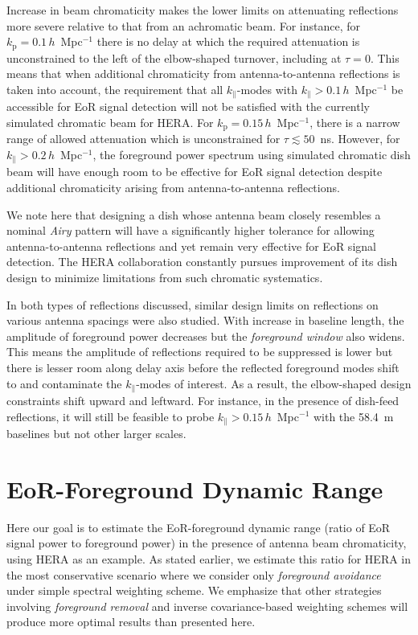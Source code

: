 \documentclass[preprint2,iop,numberedappendix,twocolappendix,appendixfloats]{emulateapj}
\begin{document}
Increase in beam chromaticity makes the lower limits on attenuating reflections more severe relative to that from an achromatic beam. For instance, for $k_\textrm{p}=0.1\,h$~Mpc$^{-1}$ there is no delay at which the required attenuation is unconstrained to the left of the elbow-shaped turnover, including at $\tau=0$. This means that when additional chromaticity from antenna-to-antenna reflections is taken into account, the requirement that all $k_\parallel$-modes with $k_\parallel > 0.1\,h$~Mpc$^{-1}$ be accessible for EoR signal detection will not be satisfied with the currently simulated chromatic beam for HERA. For $k_\textrm{p}=0.15\,h$~Mpc$^{-1}$, there is a narrow range of allowed attenuation which is unconstrained for $\tau \lesssim 50$~ns. However, for $k_\parallel > 0.2\,h$~Mpc$^{-1}$, the foreground power spectrum using simulated chromatic dish beam will have enough room to be effective for EoR signal detection despite additional chromaticity arising from antenna-to-antenna reflections. 

We note here that designing a dish whose antenna beam closely resembles a nominal {\it Airy} pattern will have a significantly higher tolerance for allowing antenna-to-antenna reflections and yet remain very effective for EoR signal detection. The HERA collaboration constantly pursues improvement of its dish design to minimize limitations from such chromatic systematics.

In both types of reflections discussed, similar design limits on reflections on various antenna spacings were also studied. With increase in baseline length, the amplitude of foreground power decreases but the {\it foreground window} also widens. This means the amplitude of reflections required to be suppressed is lower but there is lesser room along delay axis before the reflected foreground modes shift to and contaminate the $k_\parallel$-modes of interest. As a result, the elbow-shaped design constraints shift upward and leftward. For instance, in the presence of dish-feed reflections, it will still be feasible to probe $k_\parallel > 0.15\,h$~Mpc$^{-1}$ with the 58.4~m baselines but not other larger scales.

\section{EoR-Foreground Dynamic Range}\label{sec:eor-sensitivity}

Here our goal is to estimate the EoR-foreground dynamic range (ratio of EoR signal power to foreground power) in the presence of antenna beam chromaticity, using HERA as an example. As stated earlier, we estimate this ratio for HERA in the most conservative scenario where we consider only {\it foreground avoidance} under simple spectral weighting scheme. We emphasize that other strategies involving {\it foreground removal} and inverse covariance-based weighting schemes will produce more optimal results than presented here. 
\end{document}
